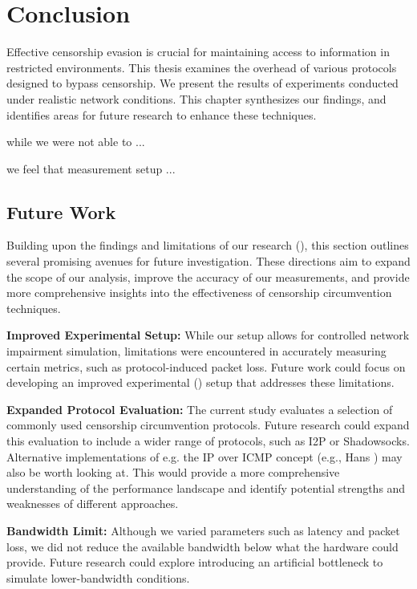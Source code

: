 
\chapter{Conclusion}
\label{chap:conclusion}

Effective censorship evasion is crucial for maintaining access to information in restricted environments.
This thesis examines the overhead of various protocols designed to bypass censorship.
We present the results of experiments conducted under realistic network conditions.
This chapter synthesizes our findings, and identifies areas for future research to enhance these techniques.


while we were not able to ...

we feel that measurement setup ...

\section{Future Work}
Building upon the findings and limitations of our research (), this section outlines several promising avenues for future investigation.
These directions aim to expand the scope of our analysis, improve the accuracy of our measurements, and provide more comprehensive insights into the effectiveness of censorship circumvention techniques.

\noindent\textbf{Improved Experimental Setup:}
While our setup allows for controlled network impairment simulation, limitations were encountered in accurately measuring certain metrics, such as protocol-induced packet loss.
Future work could focus on developing an improved experimental () setup that addresses these limitations.

\noindent\textbf{Expanded Protocol Evaluation:}
The current study evaluates a selection of commonly used censorship circumvention protocols.
Future research could expand this evaluation to include a wider range of protocols, such as I2P or Shadowsocks.
Alternative implementations of e.g. the IP over ICMP concept (e.g., Hans \cite{hans}) may also be worth looking at.
This would provide a more comprehensive understanding of the performance landscape and identify potential strengths and weaknesses of different approaches.

\noindent\textbf{Bandwidth Limit:}
Although we varied parameters such as latency and packet loss, we did not reduce the available bandwidth below what the hardware could provide.
Future research could explore introducing an artificial bottleneck to simulate lower-bandwidth conditions.

